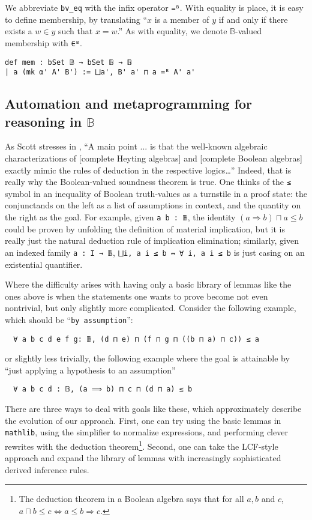 \documentclass[a4paper,USenglish,cleveref, autoref]{lipics-v2019}
\newcommand{\B}{\mathbb{B}}
\newcommand{\lil}{\lstinline}
\theoremstyle{definition}
\begin{document}
We abbreviate \lil{bv_eq} with the infix operator \lil{=ᴮ}. With equality is place, it is easy to define membership, by translating ``$x$ is a member of $y$ if and only if there exists a $w \in y$ such that $x = w$.'' As with equality, we denote $\B$-valued membership with \lil{∈ᴮ}.

\begin{lstlisting}
def mem : bSet 𝔹 → bSet 𝔹 → 𝔹
| a (mk α' A' B') := ⨆a', B' a' ⊓ a =ᴮ A' a'
\end{lstlisting}

\subsection{Automation and metaprogramming for reasoning in $\B$} \label{subsect:proof-language}
As Scott stresses in \cite{scott3}, ``A main point ... is that the well-known algebraic characterizations of [complete Heyting algebras] and [complete Boolean algebras] exactly mimic the rules of deduction in the respective logics\ldots{}'' Indeed, that is really why the Boolean-valued soundness theorem is true. One thinks of the \lil{≤} symbol in an inequality of Boolean truth-values as a turnstile in a proof state: the conjunctands on the left as a list of assumptions in context, and the quantity on the right as the goal. For example, given \lil{a b : 𝔹}, the identity $(a \Rightarrow b) \sqcap a \leq b$ could be proven by unfolding the definition of material implication, but it is really just the natural deduction rule of implication elimination; similarly, given an indexed family \lil{a : I → 𝔹}, \lstinline{⨆i, a i ≤ b ↔ ∀ i, a i ≤ b} is just casing on an existential quantifier.

Where the difficulty arises with having only a basic library of lemmas like the ones above is when the statements one wants to prove become not even nontrivial, but only slightly more complicated. Consider the following example, which should be  ``\lil{by assumption}'':
\begin{lstlisting}
  ∀ a b c d e f g: 𝔹, (d ⊓ e) ⊓ (f ⊓ g ⊓ ((b ⊓ a) ⊓ c)) ≤ a
\end{lstlisting}
or slightly less trivially, the following example where the goal is attainable by ``just applying a hypothesis to an assumption''
\begin{lstlisting}
  ∀ a b c d : 𝔹, (a ⟹ b) ⊓ c ⊓ (d ⊓ a) ≤ b
\end{lstlisting}

There are three ways to deal with goals like these, which approximately describe the evolution of our approach. First, one can try using the basic lemmas in \lil{mathlib}, using the simplifier to normalize expressions, and performing clever rewrites with the deduction theorem\footnote{The deduction theorem in a Boolean algebra says that for all $a, b$ and $c$, $a \sqcap b \leq c \iff a \leq b \Rightarrow c$.}. Second, one can take the LCF-style approach and expand the library of lemmas with increasingly sophisticated derived inference rules.
\end{document}
